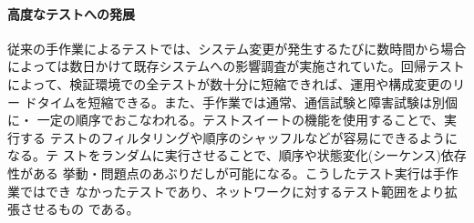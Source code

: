    \paragraph{高度なテストへの発展}
従来の手作業によるテストでは、システム変更が発生するたびに数時間から場合
によっては数日かけて既存システムへの影響調査が実施されていた。回帰テスト
によって、検証環境での全テストが数十分に短縮できれば、運用や構成変更のリー
ドタイムを短縮できる。また、手作業では通常、通信試験と障害試験は別個に・
一定の順序でおこなわれる。テストスイートの機能を使用することで、実行する
テストのフィルタリングや順序のシャッフルなどが容易にできるようになる。テ
ストをランダムに実行させることで、順序や状態変化(シーケンス)依存性がある
挙動・問題点のあぶりだしが可能になる。こうしたテスト実行は手作業ではでき
なかったテストであり、ネットワークに対するテスト範囲をより拡張させるもの
である。

